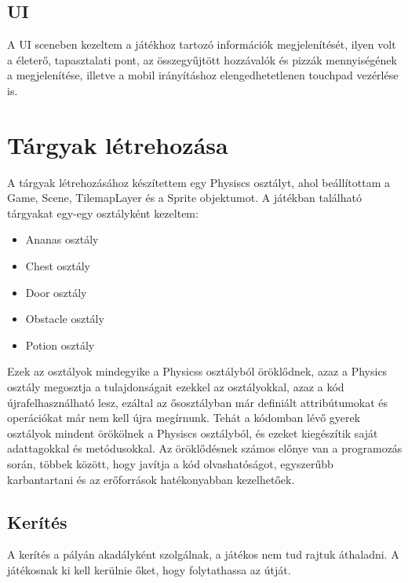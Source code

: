 \documentclass[12pt, a4paper]{report}
\theoremstyle{definition}
\begin{document}
	\subsection{UI}
	A UI sceneben kezeltem a játékhoz tartozó információk megjelenítését, ilyen volt a életerő, tapasztalati pont, az összegyűjtött hozzávalók és pizzák mennyiségének a megjelenítése, illetve a mobil irányításhoz elengedhetetlenen touchpad vezérlése is.
	
	\section{Tárgyak létrehozása}
	A tárgyak létrehozásához készítettem egy Physiscs osztályt, ahol beállítottam a Game, Scene, TilemapLayer és a Sprite objektumot. A játékban található tárgyakat egy-egy osztályként kezeltem:
	\begin{itemize} 
		\item Ananas osztály
		\item Chest osztály
		\item Door osztály
		\item Obstacle osztály
		\item Potion osztály
	\end{itemize}
	Ezek az osztályok mindegyike a Physicss osztályból öröklődnek, azaz a Physics osztály megosztja a tulajdonságait ezekkel az osztályokkal, azaz a kód újrafelhasználható lesz, ezáltal az ősosztályban már definiált attribútumokat és operációkat már nem kell újra megírnunk. Tehát a kódomban lévő gyerek osztályok mindent örökölnek a Physiscs osztályból, és ezeket kiegészítik saját adattagokkal és metódusokkal. Az öröklődésnek számos előnye van a programozás során, többek között, hogy javítja a kód olvashatóságot, egyszerűbb karbantartani és az erőforrások hatékonyabban kezelhetőek.
	
	\subsection{Kerítés}
	A kerítés a pályán akadályként szolgálnak, a játékos nem tud rajtuk áthaladni. A játékosnak ki kell kerülnie őket, hogy folytathassa az útját. 
	
\end{document}
